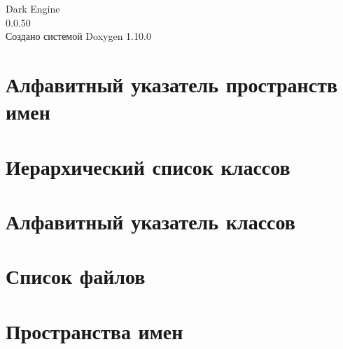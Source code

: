 \documentclass[twoside]{book}
\newcommand{\+}{\discretionary{\mbox{\scriptsize$\hookleftarrow$}}{}{}}
\newcommand{\clearemptydoublepage}{%
    \newpage{\pagestyle{empty}\cleardoublepage}%
  }
\begin{document}
  \raggedbottom
    \hypersetup{pageanchor=false,
                bookmarksnumbered=true,
                pdfencoding=unicode
               }
  \begin{titlepage}
  \vspace*{7cm}
  \begin{center}%
  {\Large Dark Engine}\\
  [1ex]\large 0.\+0.\+50 \\
  \vspace*{1cm}
  {\large Создано системой Doxygen 1.10.0}\\
  \end{center}
  \end{titlepage}
  \clearemptydoublepage
  \tableofcontents
  \clearemptydoublepage
  \hypersetup{pageanchor=true}


\chapter{Алфавитный указатель пространств имен}

\chapter{Иерархический список классов}

\chapter{Алфавитный указатель классов}

\chapter{Список файлов}

\chapter{Пространства имен}












\end{document}
